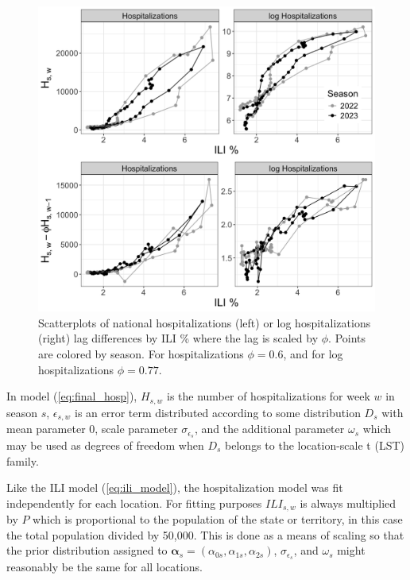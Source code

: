 \begin{figure}[hbt!]
    \includegraphics[scale=.2]{Images/ili_v_svat_vs_lagdiff.png}
    \caption{Scatterplots of national hospitalizations (left) or log 
    hospitalizations (right) lag differences by ILI \% where the lag is 
    scaled by $\phi$. Points are colored by season. For hospitalizations 
    $\phi = 0.6$, and for log hospitalizations $\phi = 0.77$. }
    \label{fig:lag_scatter}
\end{figure}



In model (\ref{eq:final_hosp}), $H_{s,w}$ is the number of hospitalizations for 
week $w$ in season $s$, $\epsilon_{s,w}$ is an error term distributed 
according to some distribution $D_s$ with mean parameter 0, scale parameter 
$\sigma_{\epsilon_s}$, and the additional parameter $\omega_s$ which 
may be used as degrees of freedom
when $D_s$ belongs to the location-scale t (LST) family.  



Like the ILI model (\ref{eq:ili_model}), 
the hospitalization model was fit independently for each location.
For fitting purposes $ILI_{s,w}$ is always 
multiplied by $P$ which is proportional to the population of the state or 
territory, in this case the total population divided by 50,000. This is done 
as a means of scaling so that the prior distribution assigned to  
$\boldsymbol{\alpha}_s = (\alpha_{0s}, \alpha_{1s}, \alpha_{2s})$, 
$\sigma_{\epsilon_s}$, and $\omega_s$ might reasonably be the same for all 
locations.


